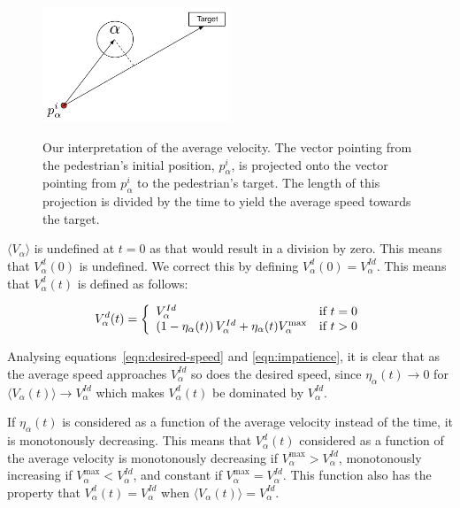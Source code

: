 \begin{figure}[ht]
    \centering
    {\includegraphics[width=0.5\textwidth]{Figures/impatience.pdf}}
    \caption[Our interpretation of the average velocity]{Our interpretation of
    the average velocity. The vector pointing from the pedestrian's initial
    position, $p^i_\alpha$, is projected onto the vector pointing from
    $p^i_\alpha$ to the pedestrian's target. The length of this projection is
    divided by the time to yield the average speed towards the target.}
    \label{impatience}
\end{figure}

$\langle V_{\alpha}\rangle$ is undefined at $t=0$ as that would result in a
division by zero. This means that $V^d_\alpha(0)$ is undefined. We correct
this by defining $V^d_\alpha(0)=V^{Id}_\alpha$. This means that $V^d_\alpha(t)$
is defined as follows:

\begin{equation}\label{eqn:cond-define}
    V_{\alpha}^{d} (t) = \left\{
    \begin{array}{l l}
        V_\alpha^{Id} & \text{if $t=0$}\\
        \left( 1 - \eta_{\alpha}(t) \right)
        V^{Id}_{\alpha} +
        \eta_{\alpha}(t) V_{\alpha}^{\text{max}}
        & \text{if $t > 0$}\\
    \end{array} \right.
\end{equation}

Analysing equations~\eqref{eqn:desired-speed} and \eqref{eqn:impatience}, it
is clear that as the average speed approaches $V^{Id}_\alpha$ so does the
desired speed, since $\eta_\alpha(t)\rightarrow0$ for $\langle V_\alpha(t)
\rangle \rightarrow V^{Id}_\alpha$ which makes $V^d_\alpha(t)$ be dominated by
$V^{Id}_\alpha$.


If $\eta_\alpha(t)$ is considered as a function of the average velocity
instead of the time, it is monotonously decreasing. This means that
$V^d_\alpha(t)$ considered as a function of the average velocity is
monotonously decreasing if $V^{\text{max}}_\alpha > V^{Id}_\alpha$,
monotonously increasing if $V^{\text{max}}_\alpha < V^{Id}_\alpha$, and
constant if $V^{\text{max}}_\alpha = V^{Id}_\alpha$. This function also has
the property that $V^d_\alpha(t)=V^{Id}_\alpha$ when $\langle V_\alpha(t)
\rangle = V^{Id}_\alpha$.

